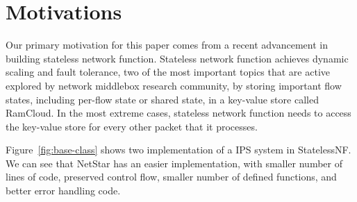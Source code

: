 \section{Motivations}

Our primary motivation for this paper comes from a recent advancement in building stateless network function. Stateless network function achieves dynamic scaling and fault tolerance, two of the most important topics that are active explored by network middlebox research community, by storing important flow states, including per-flow state or shared state, in a key-value store called RamCloud. In the most extreme cases, stateless network function needs to access the key-value store for every other packet that it processes.

Figure~\ref{fig:base-class} shows two implementation of a IPS system in StatelessNF. We can see that NetStar has an easier implementation, with smaller number of lines of code, preserved control flow, smaller number of defined functions, and better error handling code.

